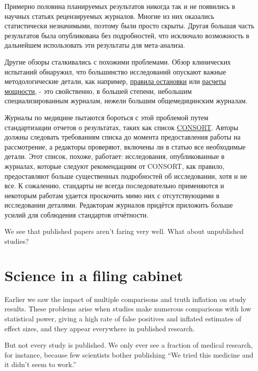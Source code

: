 Примерно половина планируемых результатов никогда так и не появились в научных статьях рецензируемых журналов. Многие из них оказались статистически незначимыми, поэтому были просто скрыты. Другая большая часть результатов была опубликована без подробностей, что исключало возможность в дальнейшем использовать эти результаты для мета-анализа. \cite{chan_empirical_2004} 


Другие обзоры сталкивались с похожими проблемами. Обзор клинических испытаний обнаружил, что большинство исследований опускают важные методологические детали, как например, \hyperref[chp7]{правила остановки} или \hyperref[chp3]{расчеты мощности}, - это свойственно, в большей степени, небольшим специализированным журналам, нежели большим общемедицинским журналам. \cite{huwiler-muntener_quality_2002}

Журналы по медицине пытаются бороться с этой проблемой путем стандартизации отчетов о результатах, таких как список \href{http://www.consort-statement.org/}{CONSORT}. Авторы должны следовать требованиям списка до момента предоставления работы на рассмотрение, а редакторы проверяют, включены ли в статью все необходимые детали. Этот список, похоже, работает: исследования, опубликованные в журналах, которые следуют рекомендациям от CONSORT, как правило, предоставляют больше существенных подробностей об исследовании, хотя и не все. \cite{plint_does_2006} К сожалению, стандарты не всегда последовательно применяются и некоторым работам удается проскочить мимо них с отсутствующими в исследовании деталями. \cite{mills_analysis_2005} Редакторам журналов придётся приложить больше усилий для соблюдения стандартов отчётности.


We see that published papers aren’t faring very well. What about unpublished studies?

\section{Science in a filing cabinet}
\label{chp10:sciencecabinet}


Earlier we saw the impact of multiple comparisons and truth inflation on study results. These problems arise when studies make numerous comparisons with low statistical power, giving a high rate of false positives and inflated estimates of effect sizes, and they appear everywhere in published research.

But not every study is published. We only ever see a fraction of medical research, for instance, because few scientists bother publishing “We tried this medicine and it didn’t seem to work.”

